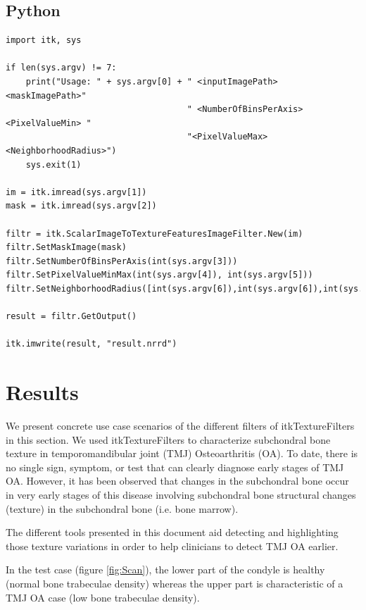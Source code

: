 \documentclass{InsightArticle}
\begin{document}
\subsection{Python}
\label{sec:pythonEx}

\begin{verbatim}
import itk, sys

if len(sys.argv) != 7:
    print("Usage: " + sys.argv[0] + " <inputImagePath> <maskImagePath>"
                                    " <NumberOfBinsPerAxis> <PixelValueMin> "
                                    "<PixelValueMax> <NeighborhoodRadius>")
    sys.exit(1)

im = itk.imread(sys.argv[1])
mask = itk.imread(sys.argv[2])

filtr = itk.ScalarImageToTextureFeaturesImageFilter.New(im)
filtr.SetMaskImage(mask)
filtr.SetNumberOfBinsPerAxis(int(sys.argv[3]))
filtr.SetPixelValueMinMax(int(sys.argv[4]), int(sys.argv[5]))
filtr.SetNeighborhoodRadius([int(sys.argv[6]),int(sys.argv[6]),int(sys.argv[6])])

result = filtr.GetOutput()

itk.imwrite(result, "result.nrrd")
\end{verbatim}
\normalsize
\newpage
\section{Results}
\label{sec:results}

We present concrete use case scenarios of the different filters of itkTextureFilters in this section. We used itkTextureFilters to characterize subchondral bone texture in temporomandibular joint (TMJ) Osteoarthritis (OA). To date, there is no single sign, symptom, or test that can clearly diagnose early stages of TMJ OA. However, it has been observed that changes in the subchondral bone occur in very early stages of this disease involving subchondral bone structural changes (texture) in the subchondral bone (i.e. bone marrow).

The different tools presented in this document aid detecting and highlighting those texture variations in order to help clinicians to detect  TMJ OA earlier.

In the test case (figure \ref{fig:Scan}), the lower part of the condyle is healthy (normal bone trabeculae density) whereas the upper part is characteristic of a TMJ OA case (low bone trabeculae density).
\end{document}
